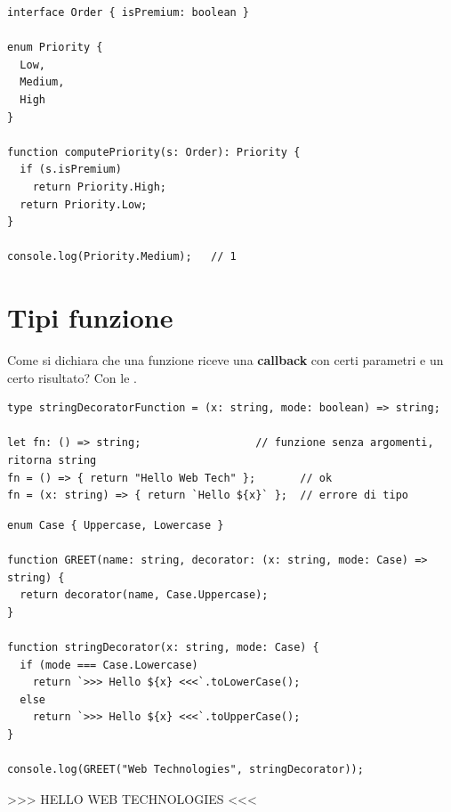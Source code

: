 \begin{affianco}[0.55][c]
\begin{lstlisting}[style=ts, name=enums.ts]
interface Order { isPremium: boolean }

enum Priority {
  Low,
  Medium,
  High
}

function computePriority(s: Order): Priority {
  if (s.isPremium)
    return Priority.High;
  return Priority.Low;
}

console.log(Priority.Medium);   // 1
\end{lstlisting}
\risultato
\begin{immagine}
\end{immagine}
\end{affianco}

\section{Tipi funzione}

Come si dichiara che una funzione riceve una \textbf{callback} con certi
parametri e un certo risultato? Con le .

\begin{lstlisting}[style=ts]
type stringDecoratorFunction = (x: string, mode: boolean) => string;

let fn: () => string;                  // funzione senza argomenti, ritorna string
fn = () => { return "Hello Web Tech" };       // ok
fn = (x: string) => { return `Hello ${x}` };  // errore di tipo
\end{lstlisting}

\begin{affianco}[0.62][c]
\codicepiccolo
\begin{lstlisting}[style=ts, name=function_types.ts]
enum Case { Uppercase, Lowercase }

function GREET(name: string, decorator: (x: string, mode: Case) => string) {
  return decorator(name, Case.Uppercase);
}

function stringDecorator(x: string, mode: Case) {
  if (mode === Case.Lowercase)
    return `>>> Hello ${x} <<<`.toLowerCase();
  else
    return `>>> Hello ${x} <<<`.toUpperCase();
}

console.log(GREET("Web Technologies", stringDecorator));
\end{lstlisting}
\risultato
\begin{console}
>>> HELLO WEB TECHNOLOGIES <<<
\end{console}
\end{affianco}


